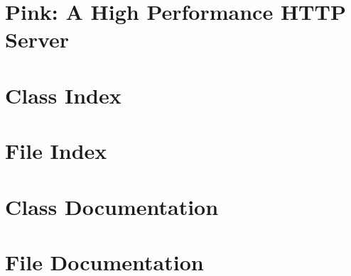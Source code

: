 \documentclass[twoside]{book}
\newcommand{\+}{\discretionary{\mbox{\scriptsize$\hookleftarrow$}}{}{}}
\newcommand{\clearemptydoublepage}{%
  \newpage{\pagestyle{empty}\cleardoublepage}%
}
\begin{document}
\chapter{Pink\+: A High Performance H\+T\+TP Server}
\label{md__r_e_a_d_m_e}

\chapter{Class Index}

\chapter{File Index}

\chapter{Class Documentation}











\chapter{File Documentation}




























\backmatter
\newpage
{}
\clearemptydoublepage
{}
\printindex
\end{document}
